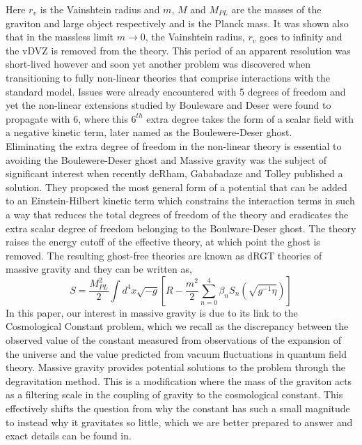\documentclass[11pt]{report}
\numberwithin{equation}{chapter}
\begin{document}
Here $r_v$ is the Vainshtein radius and $m$, $M$ and $M_{PL}$ are the masses of the graviton and large object respectively and  is the Planck mass. It was shown also that in the massless limit $m \longrightarrow 0$, the Vainshtein radius, $r_v$ goes to infinity and the vDVZ is removed from the theory\cite{Kurts_review}. This period of an apparent resolution was short-lived however and soon yet another problem was discovered when transitioning to fully non-linear theories that comprise interactions with the standard model. Issues were already encountered with 5 degrees of freedom and yet the non-linear extensions studied by Bouleware and Deser were found to propagate with 6, where this $6^{th}$ extra degree takes the form of a scalar field with a negative kinetic term, later named as the Boulewere-Deser ghost\cite{BDGhost}. \\
Eliminating the extra degree of freedom in the non-linear theory is essential to avoiding the Boulewere-Deser ghost and Massive gravity was the subject of significant interest when recently deRham, Gababadaze and Tolley published a solution\cite{de_Rham_2010}. They proposed the most general form of a potential that can be added to an Einstein-Hilbert kinetic term which constrains the interaction terms in such a way that reduces the total degrees of freedom of the theory and eradicates the extra scalar degree of freedom belonging to the Boulware-Deser ghost\cite{de_Rham_2010}\cite{de_Rham_2011}\cite{Kurts_review}. The theory raises the energy cutoff of the effective theory, at which point the ghost is removed. The resulting ghost-free theories are known as dRGT theories of massive gravity and they can be written as\cite{BDHinterbichler_2013},
\begin{equation}
    S=\frac{M_{PL}^2}{2}\int d^4x \sqrt{-g}\left[R-\frac{m^2}{2}\sum^4_{n=0}\beta_n S_n \left(\sqrt{g^{-1}\eta}\right)\right]
\end{equation}
In this paper, our interest in massive gravity is due to its link to the Cosmological Constant problem, which we recall as the discrepancy between the observed value of the constant measured from observations of the expansion of the universe and the value predicted from vacuum fluctuations in quantum field theory. Massive gravity provides potential solutions to the problem through the degravitation method. This is a modification where the mass of the graviton acts as a filtering scale in the coupling of gravity to the cosmological constant\cite{CCMassive}. This effectively shifts the question from why the constant has such a small magnitude to instead why it gravitates so little, which we are better prepared to answer and exact details can be found in\cite{BigravCC}.
\end{document}
